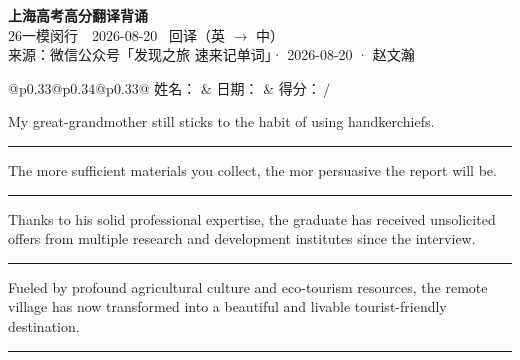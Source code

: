 \documentclass[11pt,a4paper]{article}
\newcommand{\num}[1]{\makebox[1.9em][r]{#1.}\hspace{0.3em}}
\newcommand{\wline}{\noindent\rule{\linewidth}{0.4pt}}
\begin{document}
\pagestyle{plain}
\begin{center}
{\LARGE\bfseries 上海高考高分翻译背诵 }\\[0.25em]
{\large 26一模闵行　2026-08-20 \quad\ 回译（英 $\to$ 中）}\\[0.35em]
{\footnotesize 来源：微信公众号「发现之旅 速来记单词」· 2026-08-20 · 赵文瀚}
\end{center}

\vspace{0.4em}
\noindent\begin{tabular}{@{}p{0.33\textwidth}@{}p{0.34\textwidth}@{}p{0.33\textwidth}@{}}
姓名：\underline{\hspace{2.0cm}} & 日期：\underline{\hspace{2.0cm}} & 得分：\underline{\hspace{1.4cm}}\,/ \\
\end{tabular}

\vspace{0.5em}

\vspace{0.8em}
\num{1}My great-grandmother still sticks to the habit of using handkerchiefs.

\vspace{0.25em}

\wline

\num{2}The more sufficient materials you collect, the mor persuasive the report will be.

\vspace{0.25em}

\wline

\num{3}Thanks to his solid professional expertise, the graduate has received unsolicited offers from multiple research and development institutes since the interview.

\vspace{0.25em}

\wline

\num{4}Fueled by profound agricultural culture and eco-tourism resources, the remote village has now transformed into a beautiful and livable tourist-friendly destination.

\vspace{0.25em}

\wline
\end{document}
